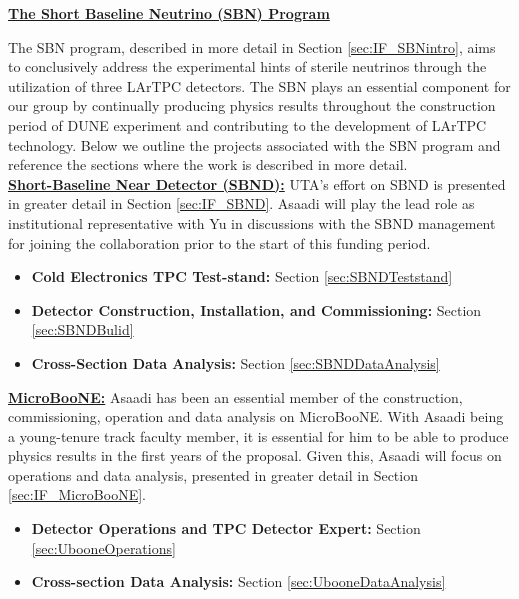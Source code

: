 \begin{center}
\underline{\Large\textbf{The Short Baseline Neutrino (SBN) Program}}
\end{center}

\noindent The SBN program, described in more detail in Section \ref{sec:IF_SBNintro}, aims to conclusively address the experimental hints of sterile neutrinos through the utilization of three LArTPC detectors. The SBN plays an essential component for our group by continually producing physics results throughout the construction period of DUNE experiment and contributing to the development of LArTPC technology. Below we outline the projects associated with the SBN program and reference the sections where the work is described in more detail.
\newline \\
\noindent \underline{\textbf{Short-Baseline Near Detector (SBND):}}  UTA's effort on SBND is presented in greater detail in Section \ref{sec:IF_SBND}. Asaadi will play the lead role as institutional representative with Yu in discussions with the SBND management for joining the collaboration prior to the start of this funding period.


\begin{itemize}
\item{\textbf{Cold Electronics TPC Test-stand:}} Section \ref{sec:SBNDTeststand}

\item{\textbf{Detector Construction, Installation, and Commissioning:}} Section \ref{sec:SBNDBulid}

\item{\textbf{Cross-Section Data Analysis:}} Section \ref{sec:SBNDDataAnalysis}

\end{itemize}

\noindent \underline{\textbf{MicroBooNE:}} Asaadi has been an essential member of the construction, commissioning, operation and data analysis on MicroBooNE. With Asaadi being a young-tenure track faculty member, it is essential for him to be able to produce physics results in the first years of the proposal. Given this, Asaadi will focus on operations and data analysis, presented in greater detail in Section \ref{sec:IF_MicroBooNE}.

\begin{itemize}
\item{\textbf{Detector Operations and TPC Detector Expert:}} Section \ref{sec:UbooneOperations}

\item{\textbf{Cross-section Data Analysis:}} Section \ref{sec:UbooneDataAnalysis}
\end{itemize}

